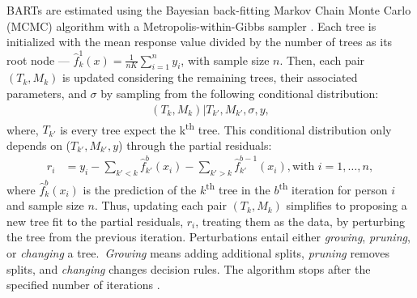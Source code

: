 \documentclass[3p,12pt,a4paper]{elsarticle}
\begin{document}
BARTs are estimated using the Bayesian back-fitting Markov Chain Monte Carlo (MCMC) algorithm with a Metropolis-within-Gibbs sampler \citep{chipman2010, hill2020, chipman2006, chipman1998,james2021}. Each tree is initialized with the mean response value divided by the number of trees as its root node --- $\hat{f}^1_k(x) = \frac{1}{nK}\sum_{i = 1}^{n}y_i$, with sample size $n$. Then, each pair $(T_k, M_k)$ is updated considering the remaining trees, their associated parameters, and $\sigma$ by sampling from the following conditional distribution: 
\begin{align}
\label{eq:backfitting}
    (T_k, M_k)|T_{k'}, M_{k'}, \sigma, y,
\end{align} where, $T_{k'}$ is every tree expect the k\textsuperscript{th} tree. This conditional distribution only depends on ($T_{k'}, M_{k'}, y$) through the partial residuals:
\begin{align}
    \label{eq:partialresiduals}
    r_i &= y_i - \sum_{k' < k} \hat{f}^{b}_{k'}(x_{i}) - \sum_{k' > k} \hat{f}^{b-1}_{k'}(x_{i}), \text{with } i = 1, \dots, n,
    \end{align} where $\hat{f}^{b}_{k}(x_{i})$ is the prediction of the $k$\textsuperscript{th} tree in the $b$\textsuperscript{th} iteration for person $i$ and sample size $n$. Thus, updating each pair $(T_k, M_k)$ simplifies to proposing a new tree fit to the partial residuals, $r_{i}$, treating them as the data, by perturbing the tree from the previous iteration. Perturbations entail either \textit{growing}, \textit{pruning}, or \textit{changing} a tree.~\textit{Growing} means adding additional splits, \textit{pruning} removes splits, and \textit{changing} changes decision rules. The algorithm stops after the specified number of iterations \citep{chipman2010, hill2020, chipman2006, chipman1998, james2021}.
\end{document}

